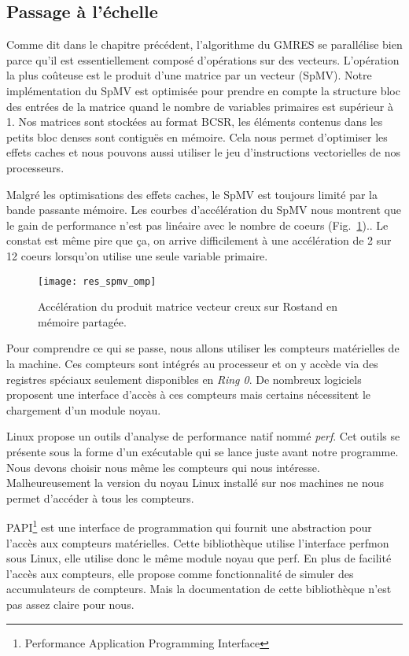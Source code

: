 \subsection{Passage à l'échelle}
Comme dit dans le chapitre précédent, l'algorithme du GMRES se parallélise bien parce qu'il est essentiellement composé d'opérations sur des vecteurs.
%
L'opération la plus coûteuse est le produit d'une matrice par un vecteur (SpMV).
%
Notre implémentation du SpMV est optimisée pour prendre en compte la structure bloc des entrées de la matrice quand le nombre de variables primaires est supérieur à 1.
%
Nos matrices sont stockées au format BCSR, les éléments contenus dans les petits bloc denses sont contiguës en mémoire.
%
Cela nous permet d'optimiser les effets caches et nous pouvons aussi utiliser le jeu d'instructions vectorielles de nos processeurs.



Malgré les optimisations des effets caches, le SpMV est toujours limité par la bande passante mémoire.
%
Les courbes d'accélération du SpMV nous montrent que le gain de performance n'est pas linéaire avec le nombre de coeurs (Fig.~\ref{fig:res_spmv_omp_rostand})..
%
Le constat est même pire que ça, on arrive difficilement à une accélération de 2 sur 12 coeurs lorsqu'on utilise une seule variable primaire.

\begin{figure}[!h]
  \centering
  \texttt{[image: res\_spmv\_omp]}
  \caption{Accélération du produit matrice vecteur creux sur Rostand en mémoire partagée.}
  \label{fig:res_spmv_omp_rostand}
\end{figure}


Pour comprendre ce qui se passe, nous allons utiliser les compteurs matérielles de la machine.
%
Ces compteurs sont intégrés au processeur et on y accède via des registres spéciaux seulement disponibles en {\em Ring 0}.
%
De nombreux logiciels proposent une interface d'accès à ces compteurs mais certains nécessitent le chargement d'un module noyau.


Linux propose un outils d'analyse de performance natif nommé {\em perf}.
%
Cet outils se présente sous la forme d'un exécutable qui se lance juste avant notre programme.
%
Nous devons choisir nous même les compteurs qui nous intéresse.
%
Malheureusement la version du noyau Linux installé sur nos machines ne nous permet d'accéder à tous les compteurs.



PAPI\footnote{Performance Application Programming Interface} est une interface de programmation qui fournit une abstraction pour l'accès aux compteurs matérielles.
%
Cette bibliothèque utilise l'interface perfmon sous Linux, elle utilise donc le même module noyau que perf.
%
En plus de facilité l'accès aux compteurs, elle propose comme fonctionnalité de simuler des accumulateurs de compteurs.
%
Mais la documentation de cette bibliothèque n'est pas assez claire pour nous.



